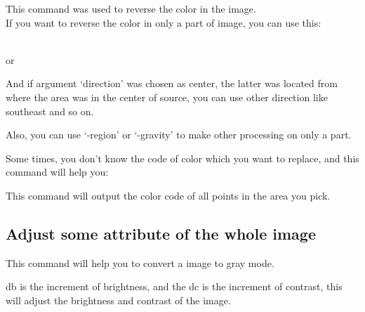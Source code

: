 \documentclass[12pt]{article}
\begin{document}
This command was used to reverse the color in the image.\\

If you want to reverse the color in only a part of image, you can use this:\\

{\centering{}\\ \vspace{5mm}
or\\ \vspace{5mm}
\par}\vspace{5mm}

And if argument `direction' was chosen as center, the latter was located from where the area was in the center of source, you can use other direction like southeast and so on.

Also, you can use `-region' or `-gravity' to make other processing on only a part.

Some times, you don't know the code of color which you want to replace, and this command will help you:\vspace{5mm}

{\centering{}\par}\vspace{5mm}

This command will output the color code of all points in the area you pick.\vspace{5mm}

\subsection{Adjust some attribute of the whole image}

{\centering{}\par}\vspace{5mm}

This command will help you to convert a image to gray mode.\vspace{5mm}

{\centering{}\par}\vspace{5mm}

db is the increment of brightness, and the dc is the increment of contrast, this will adjust the brightness and contrast of the image.
\end{document}
